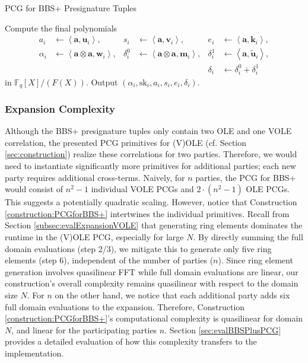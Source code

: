 \begin{specialconstruction}{PCG for BBS+ Presignature Tuples}
\begin{algorithmic}[1]
\State Compute the final polynomials
\begin{align*}
a_{i} & \leftarrow \left\langle\boldsymbol{a}, \boldsymbol{u}_{i}\right\rangle, & 
s_{i} & \leftarrow \left\langle\boldsymbol{a}, \boldsymbol{v}_{i}\right\rangle, &
e_{i} & \leftarrow \left\langle\boldsymbol{a}, \boldsymbol{k}_{i}\right\rangle, \\
\alpha_{i} & \leftarrow \left\langle\boldsymbol{a} \otimes \boldsymbol{a},  \boldsymbol{w}_{i}\right\rangle, & 
\delta_{i}^{0} & \leftarrow \left\langle\boldsymbol{a} \otimes \boldsymbol{a},  \boldsymbol{m}_{i}\right\rangle, & 
\delta_{i}^{1} & \leftarrow \left\langle\boldsymbol{a},  \widetilde{\boldsymbol{u}}_{i}\right\rangle, \\
& & & & \delta_{i} & \leftarrow \delta_{i}^{0} + \delta_{i}^{1}
\end{align*}
in $\mathbb{F}_{q}[X] / (F(X))$. Output $\left(\alpha_{i}, \mathrm{sk}_{i}, a_{i}, s_{i}, e_{i}, \delta_{i}\right)$.
\end{algorithmic}
\end{specialconstruction}



\subsubsection{Expansion Complexity}
Although the BBS+ presignature tuples only contain two OLE and one VOLE correlation, the presented PCG primitives for (V)OLE (cf. Section \ref{sec:construction}) realize these correlations for two parties. Therefore, we would need to instantiate significantly more primitives for additional parties; each new party requires additional cross-terms. Naively, for $n$ parties, the PCG for BBS+ would consist of $n^2-1$ individual VOLE PCGs and $2\cdot(n^2-1)$ OLE PCGs. This suggests a potentially quadratic scaling. However, notice that Construction \ref{construction:PCGforBBS+} intertwines the individual primitives. Recall from Section \ref{subsec:evalExpansionVOLE} that generating ring elements dominates the runtime in the (V)OLE PCG, especially for large $N$. By directly summing the full domain evaluations (step 2/3), we mitigate this to generate only five ring elements (step 6), independent of the number of parties ($n$). Since ring element generation involves quasilinear FFT while full domain evaluations are linear, our construction's overall complexity remains quasilinear with respect to the domain size $N$. For $n$ on the other hand, we notice that each additional party adds six full domain evaluations to the expansion. Therefore, Construction \ref{construction:PCGforBBS+}'s computational complexity is quasilinear for domain $N$, and linear for the participating parties $n$. Section \ref{sec:evalBBSPlusPCG} provides a detailed evaluation of how this complexity transfers to the implementation.


